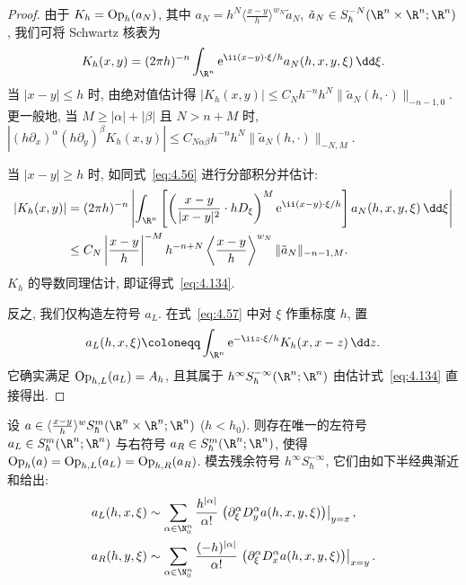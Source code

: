 \begin{proof}
由于 $K_h = \operatorname{Op}_h(a_N)$, 其中 $a_N = h^N \langle \frac{x-y}{h} \rangle^{w_N} \tilde{a}_N$, $\tilde{a}_N \in S_\hbar^{-N}(\R^n \times \R^n; \R^n)$, 我们可将 Schwartz 核表为
\begin{equation}\label{eq:4.136}
    K_h(x, y) = (2\pi h)^{-n} \int_{\R^n} \ee^{\ii (x-y) \cdot \xi / h} a_N(h, x, y, \xi) \,\dd\xi.
\end{equation}
当 $|x - y| \le h$ 时, 由绝对值估计得 $|K_h(x, y)| \le C_N h^{-n} h^N \|\tilde{a}_N(h, \cdot)\|_{-n-1, 0}$. 更一般地, 当 $M \ge |\alpha| + |\beta|$ 且 $N > n + M$ 时, $|(h \partial_x)^\alpha (h \partial_y)^\beta K_h(x, y)| \le C_{N\alpha\beta} h^{-n} h^N \|\tilde{a}_N(h, \cdot)\|_{-N, M}$.

当 $|x - y| \ge h$ 时, 如同式~\eqref{eq:4.56} 进行分部积分并估计:
\begin{equation}\label{eq:4.137}
    \begin{aligned}
        |K_h(x, y)| &= (2\pi h)^{-n} \left| \int_{\R^n} \left[ \left( \frac{x-y}{|x-y|^2} \cdot h D_\xi \right)^M \ee^{\ii (x-y) \cdot \xi / h} \right] a_N(h, x, y, \xi) \,\dd\xi \right| \\
        &\le C_N \left| \frac{x-y}{h} \right|^{-M} h^{-n+N} \left\langle \frac{x-y}{h} \right\rangle^{w_N} \|\tilde{a}_N\|_{-n-1, M}.
    \end{aligned}
\end{equation}
$K_h$ 的导数同理估计, 即证得式~\eqref{eq:4.134}.

反之, 我们仅构造左符号 $a_L$. 在式~\eqref{eq:4.57} 中对 $\xi$ 作重标度 $h$, 置
\begin{equation}\label{eq:4.138}
    a_L(h, x, \xi) \defeq \int_{\R^n} \ee^{-\ii z \cdot \xi / h} K_h(x, x - z) \,\dd z.
\end{equation}
它确实满足 $\operatorname{Op}_{h, L}(a_L) = A_h$, 且其属于 $h^\infty S_\hbar^{-\infty}(\R^n; \R^n)$ 由估计式~\eqref{eq:4.134} 直接得出.
\end{proof}

\begin{theorem}\label{thm:4.48}
设 $a \in \langle \frac{x-y}{h} \rangle^w S_\hbar^m(\R^n \times \R^n; \R^n)$ ($h < h_0$). 则存在唯一的左符号 $a_L \in S_\hbar^m(\R^n; \R^n)$ 与右符号 $a_R \in S_\hbar^m(\R^n; \R^n)$, 使得 $\operatorname{Op}_h(a) = \operatorname{Op}_{h, L}(a_L) = \operatorname{Op}_{h, R}(a_R)$. 模去残余符号 $h^\infty S_\hbar^{-\infty}$, 它们由如下半经典渐近和给出:
\begin{align}
    a_L(h, x, \xi) &\sim \sum_{\alpha \in \N_0^n} \frac{h^{|\alpha|}}{\alpha!} \left. \left( \partial_\xi^\alpha D_y^\alpha a(h, x, y, \xi) \right) \right|_{y = x}, \label{eq:4.139} \\
    a_R(h, y, \xi) &\sim \sum_{\alpha \in \N_0^n} \frac{(-h)^{|\alpha|}}{\alpha!} \left. \left( \partial_\xi^\alpha D_x^\alpha a(h, x, y, \xi) \right) \right|_{x = y}. \label{eq:4.140}
\end{align}
\end{theorem}

